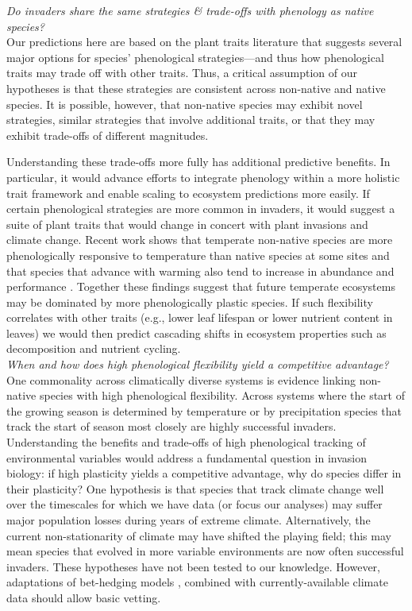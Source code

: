 \documentclass[11pt,a4paper,oneside]{article}
\begin{document}
\noindent \emph{Do invaders share the same strategies \& trade-offs with phenology as native species?}\\
\noindent  Our predictions here are based on the plant traits literature that suggests several major options for species' phenological strategies---and thus how phenological traits may trade off with other traits. Thus, a critical assumption of our hypotheses is that these strategies are consistent across non-native and native species. It is possible, however, that non-native species may exhibit novel strategies, similar strategies that involve additional traits, or that they may exhibit trade-offs of different magnitudes.

Understanding these trade-offs more fully has additional predictive benefits. In particular, it would advance efforts to integrate phenology within a more holistic trait framework and enable scaling to ecosystem predictions more easily. If certain phenological strategies are more common in invaders, it would suggest a suite of plant traits that would change in concert with plant invasions and climate change. Recent work shows that temperate non-native species are more phenologically responsive to temperature than native species at some sites \citep{wolkovichAmBot2013} and that species that advance with warming also tend to increase in abundance and performance \citep{Cleland:2012vn}. Together these findings suggest that future temperate ecosystems may be dominated by more phenologically plastic species. If such flexibility correlates with other traits (e.g., lower leaf lifespan or lower nutrient content in leaves) we would then predict cascading shifts in ecosystem properties such as decomposition and nutrient cycling. \\

\noindent \emph{When and how does high phenological flexibility yield a competitive advantage?}\\
\noindent  One commonality across climatically diverse systems is evidence linking non-native species with high phenological flexibility. Across systems where the start of the growing season is determined by temperature \citep{wolkovichAmBot2013} or by precipitation \citep{Wainwright:2012tw} species that track the start of season most closely are highly successful invaders. Understanding the benefits and trade-offs of high phenological tracking of environmental variables would address a fundamental question in invasion biology: if high plasticity yields a competitive advantage, why do species differ in their plasticity? One hypothesis is that species that track climate change well over the timescales for which we have data (or focus our analyses) may suffer major population losses during years of extreme climate. Alternatively, the current non-stationarity of climate may have shifted the playing field; this may mean species that evolved in more variable environments are now often successful invaders. These hypotheses have not been tested to our knowledge. However, adaptations of bet-hedging models \citep[e.g.,][]{donald2013}, combined with currently-available climate data should allow basic vetting. 
\end{document}
